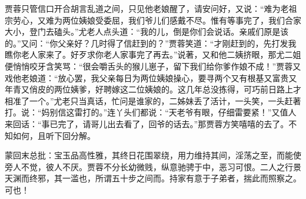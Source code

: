 \begin{parag}
    贾蓉只管信口开合胡言乱道之间，只见他老娘醒了，请安问好，又说：“难为老祖宗劳心，又难为两位姨娘受委屈，我们爷儿们感戴不尽。惟有等事完了，我们合家大小，登门去磕头。”尤老人点头道：“我的儿，倒是你们会说话。亲戚们原是该的。”又问：“你父亲好？几时得了信赶到的？”贾蓉笑道：“才刚赶到的，先打发我瞧你老人家来了。好歹求你老人家事完了再去。”说著，又和他二姨挤眼，那尤二姐便悄悄咬牙含笑骂：“很会嚼舌头的猴儿崽子，留下我们给你爹作娘不成！”贾蓉又戏他老娘道：“放心罢，我父亲每日为两位姨娘操心，要寻两个又有根基又富贵又年青又俏皮的两位姨爹，好聘嫁这二位姨娘的。这几年总没拣得，可巧前日路上才相准了一个。”尤老只当真话，忙问是谁家的，二姊妹丢了活计，一头笑，一头赶著打。说：“妈别信这雷打的。”连丫头们都说：“天老爷有眼，仔细雷要紧！”又值人来回话：“事已完了，请哥儿出去看了，回爷的话去。”那贾蓉方笑嘻嘻的去了。不知如何，且听下回分解。
\end{parag}


\begin{parag}
    \begin{note}蒙回末总批：宝玉品高性雅，其终日花围翠绕，用力维持其间，淫荡之至，而能使旁人不觉，彼人不厌。贾蓉不分长幼微贱，纵意驰骋于中，恶习可恨。二人之行景天渊而终邪，其一滥也，所谓五十步之间而。持家有意于子弟者，揣此而照察之。可也！\end{note}
\end{parag}

